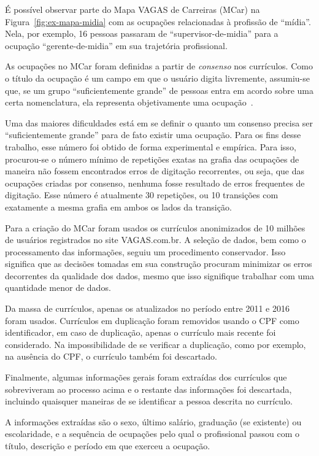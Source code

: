 \documentclass[
  article,
  11pt,
  a4paper,
  english,
  brazil,
  sumario=tradicional]{abntex2}
\begin{document}
É possível observar parte do Mapa VAGAS de Carreiras (MCar) na Figura~\ref{fig:ex-mapa-midia} com as ocupações relacionadas à profissão de \enquote{mídia}. Nela, por exemplo, 16 pessoas passaram de \enquote{supervisor-de-midia} para a ocupação \enquote{gerente-de-midia} em sua trajetória profissional.

As ocupações no MCar foram definidas a partir de \textit{consenso} nos currículos. Como o título da ocupação é um campo em que o usuário digita livremente, assumiu-se que, se um grupo \enquote{suficientemente grande} de pessoas entra em acordo sobre uma certa nomenclatura, ela representa objetivamente uma ocupação~\cite{Abbott1995-ft,Gunz2007-hr}.

Uma das maiores dificuldades está em se definir o quanto um consenso precisa ser \enquote{suficientemente grande} para de fato existir uma ocupação. Para os fins desse trabalho, esse número foi obtido de forma experimental e empírica. Para isso, procurou-se o número mínimo de repetições exatas na grafia das ocupações de maneira não fossem encontrados erros de digitação recorrentes, ou seja, que das ocupações criadas por consenso, nenhuma fosse resultado de erros frequentes de digitação. Esse número é atualmente 30 repetições, ou 10 transições com exatamente a mesma grafia em ambos os lados da transição.

Para a criação do MCar foram usados os currículos anonimizados de 10 milhões de usuários registrados no site VAGAS.com.br. A seleção de dados, bem como o processamento das informações, seguiu um procedimento conservador. Isso significa que as decisões tomadas em sua construção procuram minimizar os erros decorrentes da qualidade dos dados, mesmo que isso signifique trabalhar com uma quantidade menor de dados.

Da massa de currículos, apenas os atualizados no período entre 2011 e 2016 foram usados. Currículos em duplicação foram removidos usando o CPF como identificador, em caso de duplicação, apenas o currículo mais recente foi considerado. Na impossibilidade de se verificar a duplicação, como por exemplo, na ausência do CPF, o currículo também foi descartado.

Finalmente, algumas informações gerais foram extraídas dos currículos que sobreviveram ao processo acima e o restante das informações foi descartada, incluindo quaisquer maneiras de se identificar a pessoa descrita no currículo.

A informações extraídas são o sexo, último salário, graduação (se existente) ou escolaridade, e a sequência de ocupações pelo qual o profissional passou com o título, descrição e período em que exerceu a ocupação.
\end{document}
